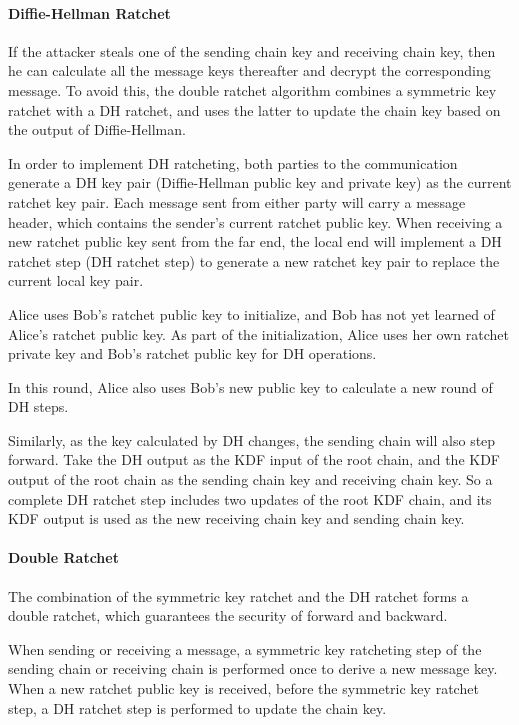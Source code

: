 \documentclass[11pt,en]{elegantpaper}
\begin{document}
\paragraph{Diffie-Hellman Ratchet}
If the attacker steals one of the sending chain key and receiving chain key, then he can calculate all the message keys thereafter and decrypt the corresponding message. To avoid this, the double ratchet algorithm combines a symmetric key ratchet with a DH ratchet, and uses the latter to update the chain key based on the output of Diffie-Hellman\cite{almuzaini2019formal,cohn2018ends}.

In order to implement DH ratcheting, both parties to the communication generate a DH key pair (Diffie-Hellman public key and private key) as the current ratchet key pair. Each message sent from either party will carry a message header, which contains the sender's current ratchet public key. When receiving a new ratchet public key sent from the far end, the local end will implement a DH ratchet step (DH ratchet step) to generate a new ratchet key pair to replace the current local key pair.

Alice uses Bob's ratchet public key to initialize, and Bob has not yet learned of Alice's ratchet public key. As part of the initialization, Alice uses her own ratchet private key and Bob's ratchet public key for DH operations.

In this round, Alice also uses Bob's new public key to calculate a new round of DH steps.

Similarly, as the key calculated by DH changes, the sending chain will also step forward. Take the DH output as the KDF input of the root chain, and the KDF output of the root chain as the sending chain key and receiving chain key. So a complete DH ratchet step includes two updates of the root KDF chain, and its KDF output is used as the new receiving chain key and sending chain key.

\paragraph{Double Ratchet}
The combination of the symmetric key ratchet and the DH ratchet forms a double ratchet, which guarantees the security of forward and backward\cite{alwen2019double,cohn2017formal,poettering2018towards}.

When sending or receiving a message, a symmetric key ratcheting step of the sending chain or receiving chain is performed once to derive a new message key. When a new ratchet public key is received, before the symmetric key ratchet step, a DH ratchet step is performed to update the chain key\cite{perrin2016double}.
\end{document}
